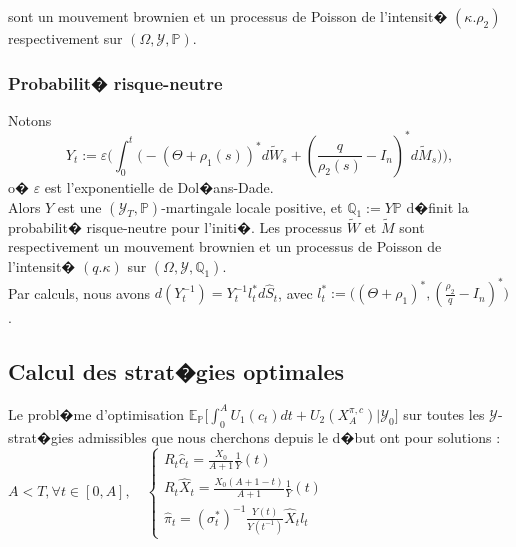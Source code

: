 \documentclass[11pt,letterpaper]{article}
\begin{document}
sont un mouvement brownien et un processus de Poisson de l'intensit� $(\kappa.\rho_2)$ respectivement sur $(\Omega, \mathcal{Y}, \mathbb{P})$.\\

\subsubsection{Probabilit� risque-neutre}
Notons
\begin{equation*}
Y_t := \varepsilon \Big(\displaystyle \int_{0}^{t} \big(-(\Theta + \rho_1(s))^* d\widetilde{W}_s + (\frac{q}{\rho_2(s)} - I_n )^* d\widetilde{M}_s\big)\Big), 
\end{equation*}
o� $\varepsilon$ est l'exponentielle de Dol�ans-Dade. \\

Alors $Y$ est une $(\mathcal{Y}_T, \mathbb{P})$-martingale locale positive, et $\mathbb{Q}_1:= Y \mathbb{P}$ d�finit la probabilit� risque-neutre pour l'initi�. Les processus $\widetilde{W}$ et $\widetilde{M}$ sont respectivement un mouvement brownien et un processus de Poisson de l'intensit� $(q.\kappa)$ sur $(\Omega, \mathcal{Y}, \mathbb{Q}_1)$.\\

Par calculs, nous avons $\displaystyle d(Y^{-1}_t) = Y^{-1}_t l^*_t d\widehat{S}_t$, avec $\displaystyle l^*_t := \big((\Theta + \rho_1)^*, (\frac{\rho_2}{q} - I_n)^*\big)$.\\

\subsection{Calcul des strat�gies optimales}
Le probl�me d'optimisation $ \mathbb{E}_{\mathbb{P}} \Big[ \displaystyle \int_{0}^{A} U_1(c_t)dt + U_2(X_A^{\pi, c})\Big|\mathcal{Y}_0\Big]$ sur toutes les $\mathcal{Y}$-strat�gies admissibles que nous cherchons depuis le d�but ont pour solutions : \\
 
$A<T, \forall t \in [0, A], \quad \begin{cases}
\displaystyle R_t \widehat{c}_t = \frac{X_0}{A+1} \frac{1}{Y}(t)\\
\displaystyle R_t \widehat{X}_t = \frac{X_0(A+1-t)}{A+1}\frac{1}{Y}(t)\\
\displaystyle \widehat{\pi}_t = (\sigma^*_t)^{-1}\frac{Y(t)}{Y(t^{-1})}\widehat{X}_t l_t
\end{cases}$
\end{document}
